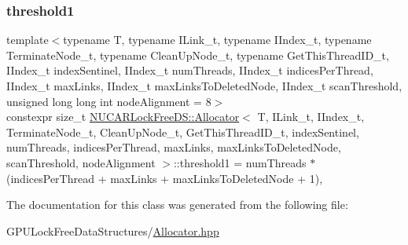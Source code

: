 \mbox{\label{class_n_u_c_a_r_lock_free_d_s_1_1_allocator_a1d220e1cc963fc9fb37e46a416504715}} 
\subsubsection{\texorpdfstring{threshold1}{threshold1}}
{\footnotesize\ttfamily template$<$typename T, typename I\+Link\+\_\+t, typename I\+Index\+\_\+t, typename Terminate\+Node\+\_\+t, typename Clean\+Up\+Node\+\_\+t, typename Get\+This\+Thread\+I\+D\+\_\+t, I\+Index\+\_\+t index\+Sentinel, I\+Index\+\_\+t num\+Threads, I\+Index\+\_\+t indices\+Per\+Thread, I\+Index\+\_\+t max\+Links, I\+Index\+\_\+t max\+Links\+To\+Deleted\+Node, I\+Index\+\_\+t scan\+Threshold, unsigned long long int node\+Alignment = 8$>$ \\
constexpr size\+\_\+t \mbox{\hyperlink{class_n_u_c_a_r_lock_free_d_s_1_1_allocator}{N\+U\+C\+A\+R\+Lock\+Free\+D\+S\+::\+Allocator}}$<$ T, I\+Link\+\_\+t, I\+Index\+\_\+t, Terminate\+Node\+\_\+t, Clean\+Up\+Node\+\_\+t, Get\+This\+Thread\+I\+D\+\_\+t, index\+Sentinel, num\+Threads, indices\+Per\+Thread, max\+Links, max\+Links\+To\+Deleted\+Node, scan\+Threshold, node\+Alignment $>$\+::threshold1 = num\+Threads $\ast$ (indices\+Per\+Thread + max\+Links + max\+Links\+To\+Deleted\+Node + 1)\hspace{0.3cm}{\ttfamily [static]}, {\ttfamily [private]}}



The documentation for this class was generated from the following file\+:\begin{DoxyCompactItemize}
\item 
G\+P\+U\+Lock\+Free\+Data\+Structures/\mbox{\hyperlink{_allocator_8hpp}{Allocator.\+hpp}}\end{DoxyCompactItemize}
